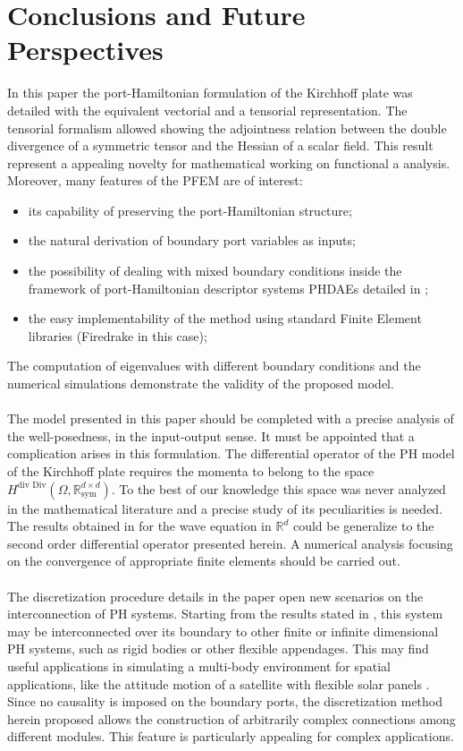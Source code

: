 \documentclass[preprint,12pt]{elsarticle}
\begin{document}
\section*{Conclusions and Future Perspectives}
{
In this paper the port-Hamiltonian formulation of the Kirchhoff plate was detailed with the equivalent vectorial and a tensorial representation. The tensorial formalism allowed showing the adjointness relation between the double divergence of a symmetric tensor and the Hessian of a scalar field. This result represent a appealing novelty for mathematical working on functional a analysis. Moreover, many features of the PFEM are of interest:
\begin{itemize}
	\item its capability of preserving the port-Hamiltonian structure;
	\item the natural derivation of boundary port variables as inputs;
	\item the possibility of dealing with mixed boundary conditions inside the framework of  port-Hamiltonian descriptor systems PHDAEs  detailed in \cite{beattie2018linear};
	\item the easy implementability of the method using standard Finite Element libraries (Firedrake \cite{firedrake} in this case);
\end{itemize}   
The computation of eigenvalues with different boundary conditions and the numerical simulations demonstrate the validity of the proposed model. \\ \\
The model presented in this paper should be completed with a precise analysis of the well-posedness, in the input-output sense. It must be appointed that a complication arises in this formulation. The differential operator of the PH model of the Kirchhoff plate requires the momenta to belong to the space $H^{\text{div Div}}(\Omega, \mathbb{R}^{d \times d}_{\text{sym}})$. To the best of our knowledge this space was never analyzed in the mathematical literature and a precise study of its peculiarities is needed. The results obtained in \cite{waveEqZwart} for the wave equation in $\mathbb{R}^d$ could be generalize to the second order differential operator presented herein. A numerical analysis focusing on the convergence of appropriate finite elements should be carried out. \\ \\
The discretization procedure details in the paper open new scenarios on the interconnection of PH systems. Starting from the results stated in \cite{ShaftIntInfinite}, this system may be interconnected over its boundary to other finite or infinite dimensional PH systems, such as rigid bodies or other flexible appendages. This may find useful applications in simulating a multi-body environment for spatial applications, like the attitude motion of a satellite with flexible solar panels \cite{aoues:hal-01738092}. Since no causality is imposed on the boundary ports, the discretization method herein proposed allows the construction of arbitrarily complex connections among different modules. This feature is particularly appealing for complex applications.
}
 	
\end{document}

